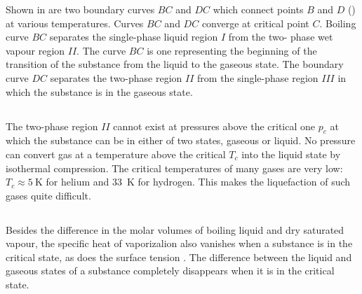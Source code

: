 Shown in  are two boundary curves $BC$ and $DC$ which connect points $B$ and $D$ () at various temperatures. Curves $BC$ and $DC$ converge at critical point $C$. Boiling curve $BC$ separates the single-phase liquid region $I$ from the two- phase wet vapour region $II$. The curve $BC$ is one representing the beginning of the  transition of the substance from the liquid to the gaseous state. The boundary curve $DC$ separates the two-phase region $II$ from the single-phase region $III$ in which the substance is in the gaseous state.

\subsection{}\label{12.3.4} The two-phase region $II$ cannot exist at pressures above the critical one $p_{c}$  at which the substance can be in either of two states, gaseous or liquid. No pressure can convert gas at a temperature above the critical $T_{c}$ into the liquid state by isothermal compression. The critical temperatures of many gases are very low: $T_{c} \approx \SI{5}{\kelvin}$ for helium and \SI{33}{\kelvin} for hydro­gen. This makes the liquefaction of such gases quite difficult. 

\subsection{}\label{12.3.5} Besides the difference in the molar volumes of boiling liquid and dry saturated vapour, the specific heat of vaporizalion  also vanishes when a substance is in the critical state, as does the surface tension . The difference between the liquid and gaseous states of a substance completely disappears when it is in the critical state.

